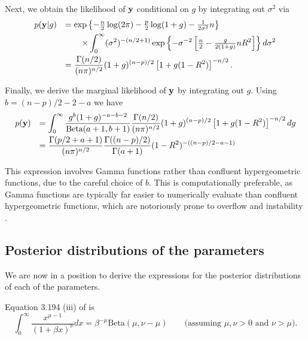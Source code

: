 \documentclass{amsart}[12pt]
\begin{document}
\noindent Next, we obtain the likelihood of ${\bf y}$ conditional on $g$ by integrating out $\sigma^2$ via
$$
\begin{array}{rl}
	\displaystyle p({\bf y}|g) 
	  & \displaystyle = \exp\left\{                                                                                 
	- \tfrac{n}{2}\log(2\pi) - \tfrac{p}{2}\log(1+g) 
	- \tfrac{1}{2\sigma^2}n
	\right\}
	\\ [1ex]
	  & \displaystyle \qquad \times                                                                                 
	\int_0^\infty (\sigma^2)^{-(n/2 + 1)}
	\exp\left\{
	- \sigma^{-2} \left[ \tfrac{n}{2} - \tfrac{g}{2(1+g)} nR^2 \right] 
	\right\} d\sigma^2
	\\ [2ex]
	  & \displaystyle = \frac{\Gamma(n/2)}{(n\pi)^{n/2}} (1 + g)^{(n-p)/2} \left[  1 + g(1 -  R^2) \right] ^{-n/2}. 
\end{array}
$$

\noindent Finally, we derive the marginal likelihood of ${\bf y}$ by integrating out $g$. Using $b= (n-p)/2 - 2 - a$ we have
$$
\begin{array}{rl}
	\displaystyle p({\bf y}) 
	  & \displaystyle = \int_0^\infty                                         
	\frac{g^{b}(1 + g)^{-a-b-2}}{\mbox{Beta}(a+1,b+1)}
	\frac{\Gamma(n/2)}{(n\pi)^{n/2}} (1 + g)^{(n-p)/2} \left[  1 + g(1 -  R^2) \right]^{-n/2}
	dg
	\\ [2ex]
	  & \displaystyle                                                         
	= \frac{\Gamma( p/2 + a + 1)}{(n\pi)^{n/2}} 
	\frac{\Gamma((n-p)/2)}{\Gamma(a+1)} (1 -  R^2)^{-((n-p)/2 - a - 1)} \\
\end{array}
$$

This expression involves Gamma functions rather than confluent hypergeometric functions, due to the careful
choice of $b$. This is computationally preferable, as Gamma functions are typically far easier to numerically
evaluate than confluent hypergeometric functions, which are notoriously prone to overflow and instability
\citep{Pearson2014}.
\subsection{Posterior distributions of the parameters}
We are now in a position to derive the expressions for the posterior distributions of each of the parameters.

Equation 3.194 (iii) of \citep{Gradshteyn1988} is
\begin{equation}\label{res:03}
	\int_0^\infty \frac{ x^{\mu - 1} }{(1 + \beta x)^\nu} dx = \beta^{-\mu} \mbox{Beta}(\mu,\nu - \mu) \quad \quad \mbox{(assuming $\mu,\nu>0$ and $\nu>\mu$).}
\end{equation}
\end{document}
